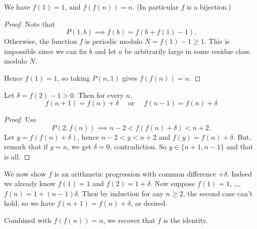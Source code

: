 \documentclass[11pt]{scrartcl}
\begin{document}
\begin{claim*}
  We have $f(1) = 1$, and $f(f(n)) = n$.
  (In particular $f$ is a bijection.)
\end{claim*}
\begin{proof}
  Note that \[ P(1,b) \implies f(b) = f(b+f(1)-1). \]
  Otherwise, the function $f$ is periodic modulo $N = f(1)-1 \ge 1$.
  This is impossible since we can fix $b$ and let $a$ be arbitrarily
  large in some residue class modulo $N$.

  Hence $f(1)=1$, so taking $P(n,1)$ gives $f(f(n)) = n$.
\end{proof}

\begin{claim*}
  Let $\delta = f(2)-1 > 0$.
  Then for every $n$,
  \[ f(n+1) = f(n) + \delta
    \quad\text{ or }\quad f(n-1) = f(n) + \delta \]
\end{claim*}
\begin{proof}
  Use
  \[ P(2, f(n)) \implies n-2 < f( f(n) + \delta ) < n+2. \]
  Let $y = f(f(n)+\delta)$, hence $n-2 < y < n+2$
  and $f(y) = f(n)+\delta$.
  But, remark that if $y = n$, we get $\delta = 0$, contradiction.
  So $y \in \{n+1, n-1\}$ and that is all.
\end{proof}

We now show $f$ is an arithmetic progression
with common difference $+\delta$.
Indeed we already know $f(1) = 1$ and $f(2) = 1+\delta$.
Now suppose $f(1)=1$, \dots, $f(n) = 1 + (n-1)\delta$.
Then by induction for any $n \ge 2$,
the second case can't hold,
so we have $f(n+1) = f(n)+\delta$, as desired.

Combined with $f(f(n)) = n$, we recover that $f$ is the identity.
\pagebreak
\end{document}
